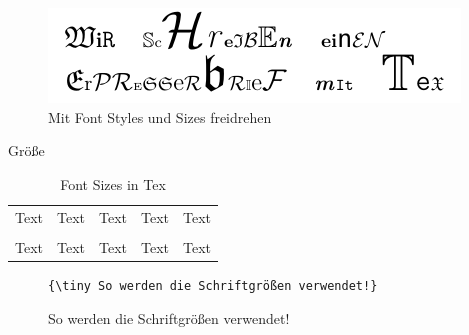\documentclass[14pt,aspectratio=169]{beamer}
\begin{document}
\begin{frame}{\insertsubsection}
    \begin{figure}
        \includegraphics[width=\textwidth]{pictures/erpresserbrief.pdf}
        \caption{Mit Font Styles und Sizes freidrehen}
    \end{figure}
\end{frame}


\begin{frame}[fragile]{\insertsubsection \quad\small Größe}
    \begin{table}
        \begin{tabular}{c|c|c|c|c}
            \texttt{\tiny}  & \texttt{\scriptsize} 
            & \texttt{\footnotesize} & \texttt{\small} 
                & \texttt{\normalsize} \\
            \hline
            {\tiny Text}             & {\scriptsize Text}
            & {\footnotesize Text}            & {\small Text}
                & {\normalsize Text}            \\
            \hline\hline
            \texttt{\large} & \texttt{\Large} 
            & \texttt{\LARGE}        & \texttt{\huge} 
                & \texttt{\Huge} \\
            \hline
            {\large Text}            & {\Large Text}
            & {\LARGE Text}                   & {\huge Text}            
                & {\Huge Text} 
        \end{tabular}
        \caption{Font Sizes in Tex}
    \end{table}

    \vspace{-0.5em}
    
    \begin{Beispiel}
        \begin{figure}
            \vspace{-0.5em}
            \begin{verbatim}
{\tiny So werden die Schriftgrößen verwendet!}
            \end{verbatim}
            \vspace{.5em}
            {\tiny So werden die Schriftgrößen verwendet!}
        \end{figure}
        \vspace{-0.5em}
    \end{Beispiel}
\end{frame}
\end{document}
